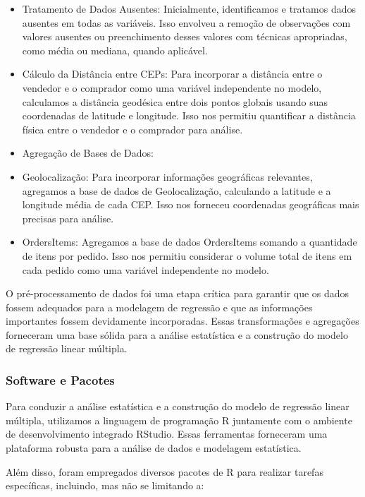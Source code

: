 \documentclass[
]{article}
\begin{document}
\begin{itemize}
\item
  Tratamento de Dados Ausentes: Inicialmente, identificamos e tratamos
  dados ausentes em todas as variáveis. Isso envolveu a remoção de
  observações com valores ausentes ou preenchimento desses valores com
  técnicas apropriadas, como média ou mediana, quando aplicável.
\item
  Cálculo da Distância entre CEPs: Para incorporar a distância entre o
  vendedor e o comprador como uma variável independente no modelo,
  calculamos a distância geodésica entre dois pontos globais usando suas
  coordenadas de latitude e longitude. Isso nos permitiu quantificar a
  distância física entre o vendedor e o comprador para análise.
\item
  Agregação de Bases de Dados:
\item
  Geolocalização: Para incorporar informações geográficas relevantes,
  agregamos a base de dados de Geolocalização, calculando a latitude e a
  longitude média de cada CEP. Isso nos forneceu coordenadas geográficas
  mais precisas para análise.
\item
  OrdersItems: Agregamos a base de dados OrdersItems somando a
  quantidade de itens por pedido. Isso nos permitiu considerar o volume
  total de itens em cada pedido como uma variável independente no
  modelo.
\end{itemize}

O pré-processamento de dados foi uma etapa crítica para garantir que os
dados fossem adequados para a modelagem de regressão e que as
informações importantes fossem devidamente incorporadas. Essas
transformações e agregações forneceram uma base sólida para a análise
estatística e a construção do modelo de regressão linear múltipla.

\hypertarget{software-e-pacotes}{%
\subsubsection{Software e Pacotes}\label{software-e-pacotes}}

Para conduzir a análise estatística e a construção do modelo de
regressão linear múltipla, utilizamos a linguagem de programação R
juntamente com o ambiente de desenvolvimento integrado RStudio. Essas
ferramentas forneceram uma plataforma robusta para a análise de dados e
modelagem estatística.

Além disso, foram empregados diversos pacotes de R para realizar tarefas
específicas, incluindo, mas não se limitando a:
\end{document}
